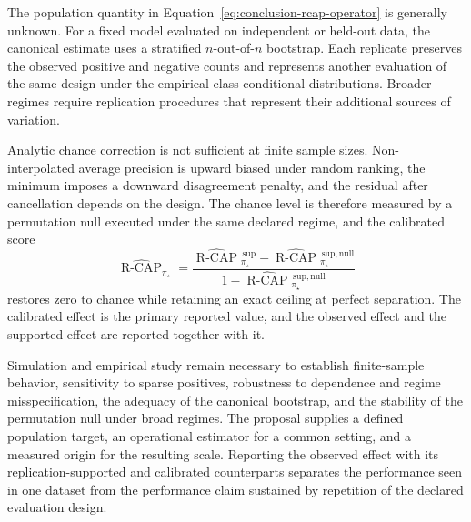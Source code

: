 \documentclass[11pt]{article}
\newcommand{\RCAPHat}{\widehat{\operatorname{R\text{-}CAP}}{}^{\,\mathrm{sup}}_{\pi_\star}}
\newcommand{\RCAPnullHat}{\widehat{\operatorname{R\text{-}CAP}}{}^{\,\mathrm{sup,null}}_{\pi_\star}}
\newcommand{\RCAPcalHat}{\widehat{\operatorname{R\text{-}CAP}}_{\pi_\star}}
\theoremstyle{remark}
\begin{document}
The population quantity in Equation~\eqref{eq:conclusion-rcap-operator} is generally unknown. For a fixed model evaluated on independent or held-out data, the canonical estimate uses a stratified $n$-out-of-$n$ bootstrap. Each replicate preserves the observed positive and negative counts and represents another evaluation of the same design under the empirical class-conditional distributions. Broader regimes require replication procedures that represent their additional sources of variation.

Analytic chance correction is not sufficient at finite sample sizes. Non-interpolated average precision is upward biased under random ranking, the minimum imposes a downward disagreement penalty, and the residual after cancellation depends on the design. The chance level is therefore measured by a permutation null executed under the same declared regime, and the calibrated score
\[
\RCAPcalHat
=
\frac{\RCAPHat-\RCAPnullHat}{1-\RCAPnullHat}
\]
restores zero to chance while retaining an exact ceiling at perfect separation. The calibrated effect is the primary reported value, and the observed effect and the supported effect are reported together with it.

Simulation and empirical study remain necessary to establish finite-sample behavior, sensitivity to sparse positives, robustness to dependence and regime misspecification, the adequacy of the canonical bootstrap, and the stability of the permutation null under broad regimes. The proposal supplies a defined population target, an operational estimator for a common setting, and a measured origin for the resulting scale. Reporting the observed effect with its replication-supported and calibrated counterparts separates the performance seen in one dataset from the performance claim sustained by repetition of the declared evaluation design.

\newpage
\end{document}
